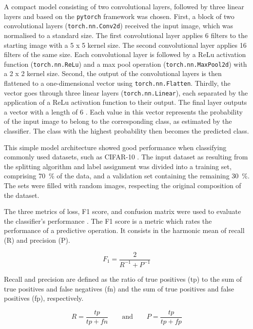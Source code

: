 A compact model consisting of two convolutional layers, followed by three linear layers and based on the \texttt{pytorch} \cite{NEURIPS2019_9015, pytorch} framework was chosen. First, a block of two convolutional layers (\texttt{torch.nn.Conv2d}) received the input image, which was normalised to a standard size. The first convolutional layer applies 6 filters to the starting image with a \num{5} x \num{5} kernel size. The second convolutional layer applies \num{16} filters of the same size. Each convolutional layer is followed by a ReLu activation function (\texttt{torch.nn.ReLu}) and a max pool operation (\texttt{torch.nn.MaxPool2d}) with a \num{2} x \num{2} kernel size. Second, the output of the convolutional layers is then flattened to a one-dimensional vector using \texttt{torch.nn.Flatten}. Thirdly, the vector goes through three linear layers (\texttt{torch.nn.Linear}), each separated by the application of a ReLu activation function to their output. The final layer outputs a vector with a length of \num{6} \cite{code}. Each value in this vector represents the probability of the input image to belong to the corresponding class, as estimated by the classifier. The class with the highest probability then becomes the predicted class.

This simple model architecture showed good performance when classifying commonly used datasets, such as CIFAR-10 \cite{NIPS2012_c399862d}. The input dataset as resulting from the splitting algorithm and label assignment was divided into a training set, comprising \qty{70}{\%} of the data, and a validation set containing the remaining \qty{30}{\%}. The sets were filled with random images, respecting the original composition of the dataset.

The three metrics of loss, F1 score, and confusion matrix were used to evaluate the classifier's performance \cite{grandini2020}. The F1 score is a metric which rates the performance of a predictive operation. It consists in the harmonic mean of recall (R) and precision (P).

\begin{equation}
    F_1=\frac{2}{R^{-1}+P^{-1}}
\end{equation}

Recall and precision are defined as the ratio of true positives (tp) to the sum of true positives and false negatives (fn) and the sum of true positives and false positives (fp), respectively.

\begin{equation}
    R=\frac{tp}{tp+fn}
        \quad\quad\text{and}\quad\quad
    P=\frac{tp}{tp+fp}
\end{equation}

